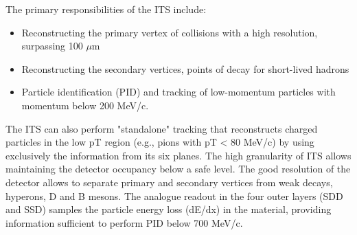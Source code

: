 \documentclass[12pt,a4paper]{book}
\begin{document}
	The primary responsibilities of the ITS include:
    \begin{itemize}
    	\item 	Reconstructing the primary vertex of collisions with a high resolution, surpassing 100 $\mu$m
    	\item 	Reconstructing the secondary vertices, points of decay for short-lived hadrons
    	\item 	Particle identification (PID) and tracking of low-momentum particles with momentum below 200 MeV/c.
    \end{itemize}
	The ITS can also perform "standalone" tracking that reconstructs charged particles in the low pT region (e.g., pions with pT < 80 MeV/c) by using exclusively the information from its six planes. The high granularity of ITS allows maintaining the detector occupancy below a safe level. The good resolution of the detector allows to separate primary and secondary vertices from weak decays, hyperons, D and B mesons. The analogue readout in the four outer layers (SDD and SSD) samples the particle energy loss (dE/dx) in the material, providing information sufficient to perform PID below 700 MeV/c. %
	\cite{Padhan:2924203} \cite{amsdottorato9036} \cite{Cheng:2908766} \cite{Arata:2922803}
	
\end{document}
